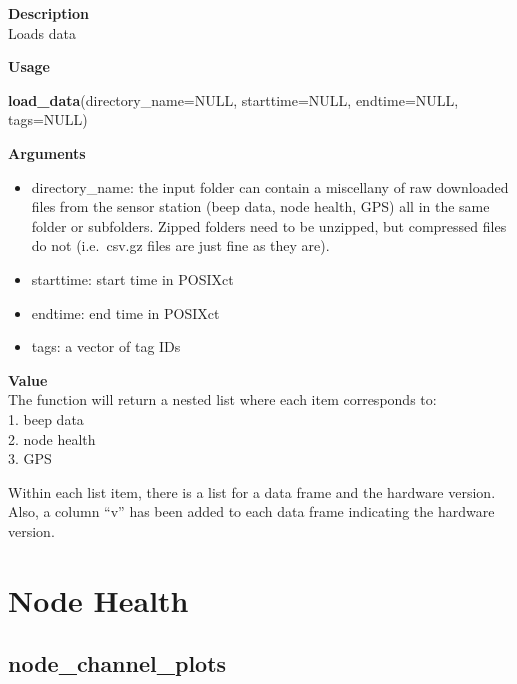 \documentclass[
]{book}
\newenvironment{Shaded}{\begin{snugshade}}{\end{snugshade}}
\newcommand{\AttributeTok}[1]{\textcolor[rgb]{0.13,0.29,0.53}{#1}}
\newcommand{\ConstantTok}[1]{\textcolor[rgb]{0.56,0.35,0.01}{#1}}
\newcommand{\FunctionTok}[1]{\textcolor[rgb]{0.13,0.29,0.53}{\textbf{#1}}}
\newcommand{\NormalTok}[1]{#1}
\providecommand{\tightlist}{%
  \setlength{\itemsep}{0pt}\setlength{\parskip}{0pt}}
\begin{document}
\textbf{Description}\\
Loads data

\textbf{Usage}

\begin{Shaded}
\begin{Highlighting}[]
\FunctionTok{load\_data}\NormalTok{(}\AttributeTok{directory\_name=}\ConstantTok{NULL}\NormalTok{, }\AttributeTok{starttime=}\ConstantTok{NULL}\NormalTok{, }\AttributeTok{endtime=}\ConstantTok{NULL}\NormalTok{, }\AttributeTok{tags=}\ConstantTok{NULL}\NormalTok{)  }
\end{Highlighting}
\end{Shaded}

\textbf{Arguments}

\begin{itemize}
\tightlist
\item
  directory\_name: the input folder can contain a miscellany of raw downloaded files from the sensor station (beep data, node health, GPS) all in the same folder or subfolders. Zipped folders need to be unzipped, but compressed files do not (i.e.~csv.gz files are just fine as they are).\\
\item
  starttime: start time in POSIXct\\
\item
  endtime: end time in POSIXct\\
\item
  tags: a vector of tag IDs
\end{itemize}

\textbf{Value}\\
The function will return a nested list where each item corresponds to:\\
1. beep data\\
2. node health\\
3. GPS

Within each list item, there is a list for a data frame and the hardware version. Also, a column ``v'' has been added to each data frame indicating the hardware version.

\section{Node Health}\label{node-health}

\subsection{node\_channel\_plots}\label{node_channel_plots}
\end{document}
